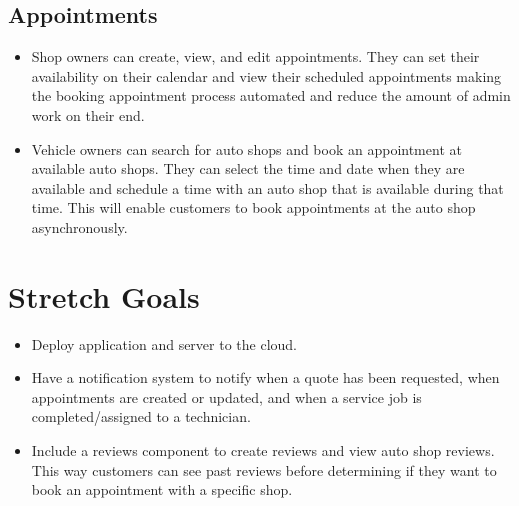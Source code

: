 \documentclass{article}
\begin{document}
\subsection{Appointments}
\begin{itemize}
\item Shop owners can create, view, and edit appointments. They can set their availability on their calendar and view their scheduled appointments making the booking appointment process automated and reduce the amount of admin work on their end.
\item Vehicle owners can search for auto shops and book an appointment at available auto shops. They can select the time and date when they are available and schedule a time with an auto shop that is available during that time. This will enable customers to book appointments at the auto shop asynchronously.
\end{itemize}

\section{Stretch Goals}
\begin{itemize}
    \item Deploy application and server to the cloud.
    \item Have a notification system to notify when a quote has been requested, when appointments are created or updated, and when a service job is completed/assigned to a technician.
    \item Include a reviews component to create reviews and view auto shop reviews. This way customers can see past reviews before determining if they want to book an appointment with a specific shop.
\end{itemize}
\end{document}
